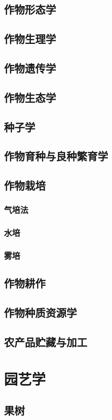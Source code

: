 \documentclass[UTF8]{../ApplicationUniverse}
\begin{document}
\section{作物形态学}
\section{作物生理学}
\section{作物遗传学}
\section{作物生态学}
\section{种子学}
\section{作物育种与良种繁育学}
\section{作物栽培}
  \subsection{气培法}
  \subsection{水培}
  \subsection{雾培}
\section{作物耕作}
\section{作物种质资源学}
\section{农产品贮藏与加工}

\chapter{园艺学}
\section{果树}
\end{document}
